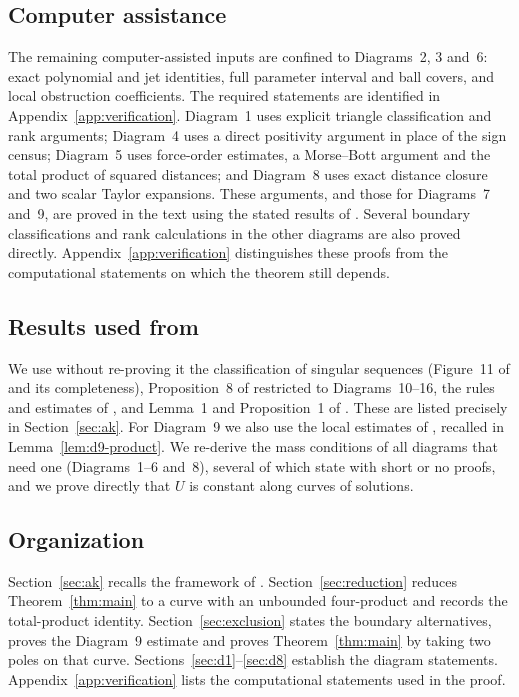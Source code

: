 \documentclass[11pt]{amsart}
\theoremstyle{definition}
\theoremstyle{remark}
\begin{document}
\subsection*{Computer assistance}
{The remaining computer-assisted inputs are confined to Diagrams~2, 3 and~6:
exact polynomial and jet identities, full parameter interval and ball covers, and local
obstruction coefficients.  The required statements are identified in
Appendix~\ref{app:verification}.  Diagram~1 uses explicit triangle classification and rank
arguments; Diagram~4 uses a direct positivity argument in place of the sign census;
Diagram~5 uses force-order estimates, a Morse--Bott argument and the total product of
squared distances; and Diagram~8 uses exact distance closure and two scalar Taylor expansions.
These arguments, and those for Diagrams~7 and~9, are proved in the text using the stated results
of \cite{AK}.  Several boundary classifications and rank calculations in the other diagrams
are also proved directly.  Appendix~\ref{app:verification} distinguishes these proofs from
the computational statements on which the theorem still depends.

}\subsection*{Results used from \texorpdfstring{\cite{AK}}{Albouy and Kaloshin}}
We use without re-proving it the classification of singular sequences (Figure~11 of
\cite{AK} and its completeness), Proposition~8 of \cite{AK} restricted to Diagrams~10--16, the rules and estimates of
\cite[\S3]{AK}, and Lemma~1 and Proposition~1 of \cite{AK}.  These are listed precisely in
Section~\ref{sec:ak}.  For Diagram~9 we also use the local estimates of \cite[\S8.9]{AK},
recalled in Lemma~\ref{lem:d9-product}.  We re-derive the mass conditions of all diagrams that need one
(Diagrams~1--6 and~8), several of which \cite[\S\S8.3--8.8]{AK} state with short or no proofs,
and we prove directly that $U$ is constant along curves of solutions.

\subsection*{Organization}
{
Section~\ref{sec:ak} recalls the framework of \cite{AK}.  Section~\ref{sec:reduction} reduces
Theorem~\ref{thm:main} to a curve with an unbounded four-product and records the total-product
identity.  Section~\ref{sec:exclusion} states the boundary alternatives, proves the
Diagram~9 estimate and proves Theorem~\ref{thm:main} by taking two poles on that curve.  Sections~\ref{sec:d1}--\ref{sec:d8}
establish the diagram statements.  Appendix~\ref{app:verification} lists the computational statements used in the proof.
}
\end{document}
